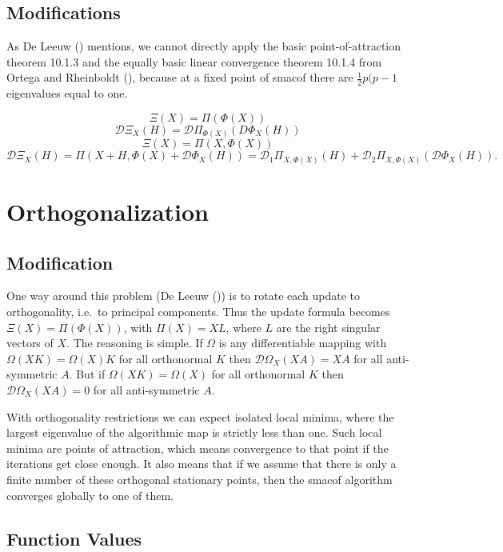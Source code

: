 \documentclass[
  12pt,
  letterpaper,
  DIV=11,
  numbers=noendperiod]{scrartcl}
\begin{document}
\subsection{Modifications}\label{modifications}

As De Leeuw () mentions, we cannot
directly apply the basic point-of-attraction theorem 10.1.3 and the
equally basic linear convergence theorem 10.1.4 from Ortega and
Rheinboldt (), because at a
fixed point of smacof there are \(\frac12 p(p-1\) eigenvalues equal to
one.

\[\Xi(X)=\Pi(\Phi(X))\] \[
\mathcal{D}\Xi_X(H)=\mathcal{D}\Pi_{\Phi(X)}(D\Phi_X(H))
\] \[
\Xi(X)=\Pi(X,\Phi(X))
\] \[
\mathcal{D}\Xi_X(H)=\Pi(X+H,\Phi(X)+\mathcal{D}\Phi_X(H))=\mathcal{D}_1\Pi_{X,\Phi(X)}(H)+
\mathcal{D}_2\Pi_{X,\Phi(X)}(\mathcal{D}\Phi_X(H)).
\]

\section{Orthogonalization}\label{orthogonalization}

\subsection{Modification}\label{modification}

One way around this problem (De Leeuw
()) is to rotate each update to
orthogonality, i.e.~to principal components. Thus the update formula
becomes \(\Xi(X)=\Pi(\Phi(X))\), with \(\Pi(X)=XL\), where \(L\) are the
right singular vectors of \(X\). The reasoning is simple. If \(\Omega\)
is any differentiable mapping with \(\Omega(XK)=\Omega(X)K\) for all
orthonormal \(K\) then \(\mathcal{D}\Omega_X(XA)=XA\) for all
anti-symmetric \(A\). But if \(\Omega(XK)=\Omega(X)\) for all
orthonormal \(K\) then \(\mathcal{D}\Omega_X(XA)=0\) for all
anti-symmetric \(A\).

With orthogonality restrictions we can expect isolated local minima,
where the largest eigenvalue of the algorithmic map is strictly less
than one. Such local minima are points of attraction, which means
convergence to that point if the iterations get close enough. It also
means that if we assume that there is only a finite number of these
orthogonal stationary points, then the smacof algorithm converges
globally to one of them.

\subsection{Function Values}\label{function-values-1}
\end{document}
